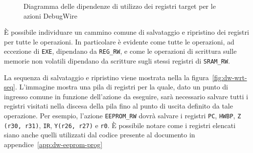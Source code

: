 \begin{figure}[h]
{
    }

    \caption[]{Diagramma delle dipendenze di utilizzo dei registri target per le azioni DebugWire}\label{fig:dw-wrt-deps}
\end{figure}

È possibile individuare un cammino comune di salvataggio e ripristino dei registri per tutte le operazioni. In particolare è evidente come tutte le operazioni, ad eccezione di \texttt{EXE}, dipendano da \texttt{REG\_RW}, e come le operazioni di scrittura sulle memorie non volatili dipendano da scritture sugli stessi registri di \texttt{SRAM\_RW}.

La sequenza di salvataggio e ripristino viene mostrata nella la figura~\ref{fig:dw-wrt-seq}. L'immagine mostra una pila di registri per la quale, dato un punto di ingresso comune in funzione dell'azione da eseguire, sarà necessario salvare tutti i registri visitati nella discesa della pila fino al punto di uscita definito da tale operazione. Per esempio, l'azione \texttt{EEPROM\_RW} dovrà salvare i registri \texttt{PC}, \texttt{HWBP}, \texttt{Z (r30, r31)}, \texttt{IR}, \texttt{Y(r26, r27)} e \texttt{r0}. È possibile notare come i registri elencati siano anche quelli utilizzati dal codice presente al documento in appendice~\ref{app:dw-eeprom-prog}

